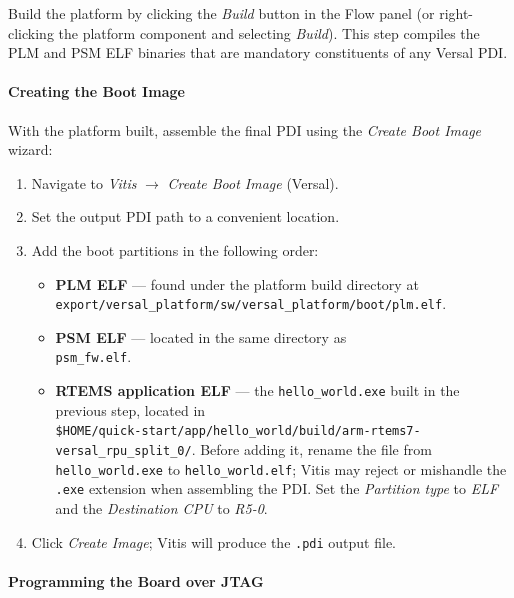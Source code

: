 \documentclass[
	a4paper,
]{CSMakotoTechnicalReport}
\begin{document}
Build the platform by clicking the \textit{Build} button in the Flow panel (or right-clicking the platform component and selecting \textit{Build}).
This step compiles the PLM and PSM ELF binaries that are mandatory constituents of any Versal PDI.

\paragraph*{Creating the Boot Image} %

With the platform built, assemble the final PDI using the \textit{Create Boot Image} wizard:

\begin{enumerate}
    \item Navigate to \textit{Vitis} $\to$ \textit{Create Boot Image} (Versal).
    \item Set the output PDI path to a convenient location.
    \item Add the boot partitions in the following order:
    \begin{itemize}
        \item \textbf{PLM ELF} --- found under the platform build directory at\\
              \texttt{export/versal\_platform/sw/versal\_platform/boot/plm.elf}.
        \item \textbf{PSM ELF} --- located in the same directory as\\
              \texttt{psm\_fw.elf}.
        \item \textbf{RTEMS application ELF} --- the \texttt{hello\_world.exe} built in the previous step, located in\\
              \texttt{\$HOME/quick-start/app/hello\_world/build/arm-rtems7-versal\_rpu\_split\_0/}.
              Before adding it, rename the file from \texttt{hello\_world.exe} to \texttt{hello\_world.elf}; Vitis may reject or mishandle the \texttt{.exe} extension when assembling the PDI.
              Set the \textit{Partition type} to \textit{ELF} and the \textit{Destination CPU} to \textit{R5-0}.
    \end{itemize}
    \item Click \textit{Create Image}; Vitis will produce the \texttt{.pdi} output file.
\end{enumerate}

\paragraph*{Programming the Board over JTAG} %
\end{document}

